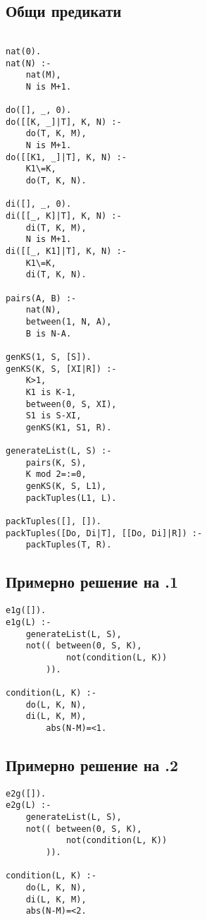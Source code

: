 \documentclass[12pt]{article}
\newenvironment{longlisting}{\captionsetup{type=listing}}{}
\begin{document}
\subsection{Общи предикати}
\begin{longlisting}
\begin{verbatim}

nat(0).
nat(N) :-
    nat(M),
    N is M+1.

do([], _, 0).
do([[K, _]|T], K, N) :-
    do(T, K, M),
    N is M+1.
do([[K1, _]|T], K, N) :-
    K1\=K,
    do(T, K, N).

di([], _, 0).
di([[_, K]|T], K, N) :-
    di(T, K, M),
    N is M+1.
di([[_, K1]|T], K, N) :-
    K1\=K,
    di(T, K, N).

pairs(A, B) :-
    nat(N),
    between(1, N, A),
    B is N-A.

genKS(1, S, [S]).
genKS(K, S, [XI|R]) :-
    K>1,
    K1 is K-1,
    between(0, S, XI),
    S1 is S-XI,
    genKS(K1, S1, R). 

generateList(L, S) :-
    pairs(K, S),
    K mod 2=:=0,
    genKS(K, S, L1),
    packTuples(L1, L).

packTuples([], []).
packTuples([Do, Di|T], [[Do, Di]|R]) :-
    packTuples(T, R).

\end{verbatim}
\end{longlisting}

\vskip 0.2in

\subsection{Примерно решение на .1} 
\begin{longlisting}
\begin{verbatim}
e1g([]).
e1g(L) :-
    generateList(L, S),
    not(( between(0, S, K),
            not(condition(L, K))
        )).

condition(L, K) :-
    do(L, K, N),
    di(L, K, M),
        abs(N-M)=<1.
\end{verbatim}
\end{longlisting}

\vskip 0.2in

\subsection{Примерно решение на .2} 
\begin{longlisting}
\begin{verbatim}
e2g([]).
e2g(L) :-
    generateList(L, S),
    not(( between(0, S, K),
            not(condition(L, K))
        )).

condition(L, K) :-
    do(L, K, N),
    di(L, K, M),
    abs(N-M)=<2.
\end{verbatim}
\end{longlisting}
\end{document}
